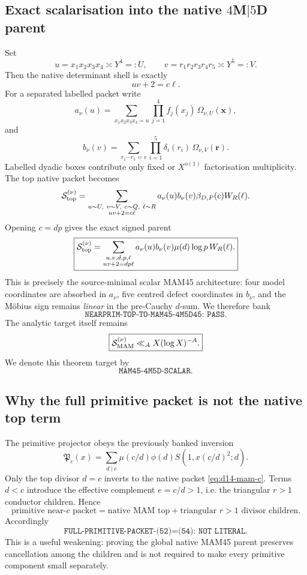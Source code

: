 \documentclass[11pt]{article}
\theoremstyle{definition}
\newcommand{\1}{\mathbf 1}
\begin{document}
\subsection{Exact scalarisation into the native \texorpdfstring{$4$M$\mid5$D}{4M|5D} parent}
Set
\begin{equation}
 u=x_1x_2x_3x_4\asymp Y^4=:U,
 \qquad
 v=r_1r_2r_3r_4r_5\asymp Y^5=:V.
\label{eq:d14-uv}
\end{equation}
Then the native determinant shell is exactly
\begin{equation}
 \boxed{uv+2=c\ell.}
\label{eq:d14-native-shell}
\end{equation}
For a separated labelled packet write
\[
 a_\nu(u)
 =\sum_{x_1x_2x_3x_4=u}
   \prod_{j=1}^{4}f_j(x_j)\,\Omega_{\nu,U}(\mathbf x),
\]
and
\[
 b_\nu(v)
 =\sum_{r_1\cdots r_5=v}
   \prod_{i=1}^{5}\delta_i(r_i)\,\Omega_{\nu,V}(\mathbf r).
\]
Labelled dyadic boxes contribute only fixed or $X^{o(1)}$ factorisation
multiplicity.  The top native packet becomes
\begin{equation}
 \mathcal S_{\rm top}^{(\nu)}
 =\sum_{\substack{u\sim U,\ v\sim V,\ c\sim Q,\ \ell\sim R\\
 uv+2=c\ell}}
 a_\nu(u)b_\nu(v)\beta_{D,P}(c)W_R(\ell).
\label{eq:d14-mam-c}
\end{equation}
Opening $c=dp$ gives the exact signed parent
\begin{equation}
 \boxed{
 \mathcal S_{\rm top}^{(\nu)}
 =\sum_{\substack{u,v,d,p,\ell\\uv+2=dp\ell}}
 a_\nu(u)b_\nu(v)\mu(d)\log p\,W_R(\ell).
 }
\label{eq:d14-mam-dp}
\end{equation}
This is precisely the source-minimal scalar MAM45 architecture: four model
coordinates are absorbed in $a_\nu$, five centred defect coordinates in
$b_\nu$, and the M\"obius sign remains \emph{linear} in the pre-Cauchy
$d$-sum.  We therefore bank
\[
 \boxed{\texttt{NEARPRIM-TOP-TO-MAM45-4M5D45: PASS}.}
\]
The analytic target itself remains
\begin{equation}
 \boxed{
 \mathcal S_{\rm MAM}^{(\nu)}
 \ll_A X(\log X)^{-A}.
 }
\label{eq:d14-mam-target}
\end{equation}
We denote this theorem target by
\[
 \boxed{\texttt{MAM45-4M5D-SCALAR}.}
\]

\subsection{Why the full primitive packet is not the native top term}
The primitive projector obeys the previously banked inversion
\[
 \mathfrak P_c(x)
 =\sum_{d\mid c}\mu(c/d)\phi(d)
 S\!\left(1,x\overline{(c/d)^2};d\right).
\]
Only the top divisor $d=c$ inverts to the native packet
\eqref{eq:d14-mam-c}.  Terms $d<c$ introduce the effective complement
$e=c/d>1$, i.e. the triangular $r>1$ conductor children.  Hence
\[
 \boxed{
 \text{primitive near-$c$ packet}
 =\text{native MAM top}
 +\text{triangular $r>1$ divisor children}.
 }
\]
Accordingly
\[
 \boxed{\texttt{FULL-PRIMITIVE-PACKET-(52)=(54): NOT LITERAL}.}
\]
This is a useful weakening: proving the global native MAM45 parent preserves
cancellation among the children and is not required to make every primitive
component small separately.
\end{document}
